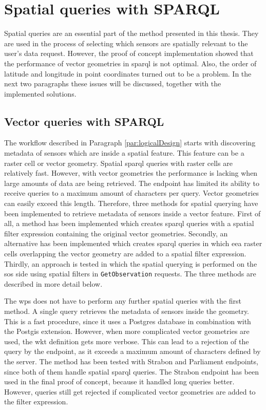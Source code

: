 \section{Spatial queries with SPARQL}
\label{par:spQueries}
Spatial queries are an essential part of the method presented in this thesis. They are used in the process of selecting which sensors are spatially relevant to the user's data request. However, the proof of concept implementation showed that the performance of vector geometries in \ac{sparql} is not optimal. Also, the order of latitude and longitude in point coordinates turned out to be a problem. In the next two paragraphs these issues will be discussed, together with the implemented solutions.     

\subsection{Vector queries with SPARQL}
The workflow described in Paragraph \ref{par:logicalDesign} starts with discovering metadata of sensors which are inside a spatial feature. This feature can be a raster cell or vector geometry. Spatial \ac{sparql} queries with raster cells are relatively fast. However, with vector geometries the performance is lacking when large amounts of data are being retrieved. The endpoint has limited its ability to receive queries to a maximum amount of characters per query. Vector geometries can easily exceed this length. Therefore, three methods for spatial querying have been implemented to retrieve metadata of sensors inside a vector feature. First of all, a method has been implemented which creates \ac{sparql} queries with a spatial filter expression containing the original vector geometries. Secondly, an alternative has been implemented which creates \ac{sparql} queries in which \ac{eea} raster cells overlapping the vector geometry are added to a spatial filter expression. Thirdly, an approach is tested in which the spatial querying is performed on the \ac{sos} side using spatial filters in \texttt{GetObservation} requests. The three methods are described in more detail below.

The \ac{wps} does not have to perform any further spatial queries with the first method. A single query retrieves the metadata of sensors inside the geometry. This is a fast procedure, since it uses a Postgres database in combination with the Postgis extension. However, when more complicated vector geometries are used, the \ac{wkt} definition gets more verbose. This can lead to a rejection of the query by the endpoint, as it exceeds a maximum amount of characters defined by the server. The method has been tested with Strabon and Parliament endpoints, since both of them handle spatial \ac{sparql} queries. The Strabon endpoint has been used in the final proof of concept, because it handled long queries better. However, queries still get rejected if complicated vector geometries are added to the filter expression.    

